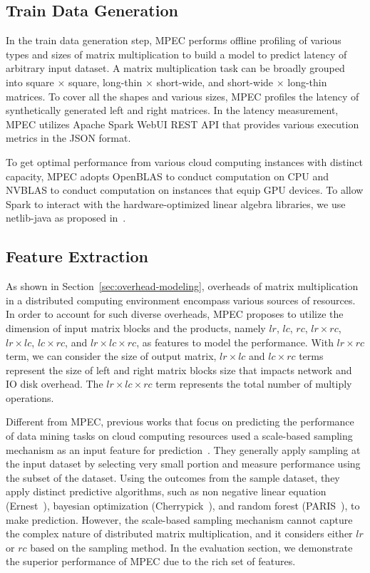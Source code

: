 \documentclass[10pt, conference, compsocconf]{IEEEtran}
\begin{document}
\subsection{Train Data Generation}\label{sec:train-data}
In the train data generation step, MPEC performs offline profiling of various types and sizes of matrix multiplication to build a model to predict latency of arbitrary input dataset. A matrix multiplication task can be broadly grouped into square $\times$ square, long-thin $\times$ short-wide, and short-wide $\times$ long-thin matrices. To cover all the shapes and various sizes, MPEC profiles the latency of synthetically generated left and right matrices. In the latency measurement, MPEC utilizes Apache Spark WebUI REST API that provides various execution metrics in the JSON format.

To get optimal performance from various cloud computing instances with distinct capacity, MPEC adopts OpenBLAS to conduct computation on CPU and NVBLAS to conduct computation on instances that equip GPU devices. To allow Spark to interact with the hardware-optimized linear algebra libraries, we use netlib-java as proposed in~\cite{fatman-littleboy}.

\subsection{Feature Extraction}\label{sec:features}
As shown in Section~\ref{sec:overhead-modeling}, overheads of matrix multiplication in a distributed computing environment encompass various sources of resources. In order to account for such diverse overheads, MPEC proposes to utilize the dimension of input matrix blocks and the products, namely $lr$, $lc$, $rc$, $lr \times rc$, $lr \times lc$, $lc \times rc$, and $lr \times lc \times rc$, as features to model the performance. With $lr \times rc$ term, we can consider the size of output matrix, $lr \times lc$ and $lc \times rc$ terms represent the size of left and right matrix blocks size that impacts network and IO disk overhead. The $lr \times lc \times rc$ term represents the total number of multiply operations.

Different from MPEC, previous works that focus on predicting the performance of data mining tasks on cloud computing resources used a scale-based sampling mechanism as an input feature for prediction~\cite{ernest, cherrypick, paris}. They generally apply sampling at the input dataset by selecting very small portion and measure performance using the subset of the dataset. Using the outcomes from the sample dataset, they apply distinct predictive algorithms, such as non negative linear equation (Ernest~\cite{ernest}), bayesian optimization (Cherrypick~\cite{cherrypick}), and random forest (PARIS~\cite{paris}), to make prediction. However, the scale-based sampling mechanism cannot capture the complex nature of distributed matrix multiplication, and it considers either $lr$ or $rc$ based on the sampling method. In the evaluation section, we demonstrate the superior performance of MPEC due to the rich set of features.
\end{document}
